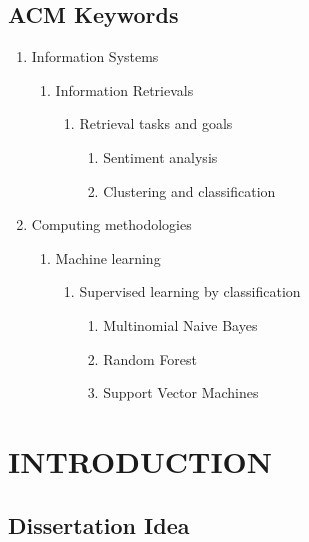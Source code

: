 \documentclass[oneside,a4paper,12pt]{pictreport}
\begin{document}
\section{ACM Keywords}
\begin{enumerate}[label=\Alph*]
    \item Information Systems
    \begin{enumerate}[label*=.\arabic*]
    \item Information Retrievals
    \begin{enumerate}[label*=.\arabic*]
        \item Retrieval tasks and goals
        \begin{enumerate}[label*=.\arabic*]
            \item Sentiment analysis
            \item Clustering and classification
        \end{enumerate}
        \end{enumerate}
    \end{enumerate}
    \item Computing methodologies
        \begin{enumerate}[label*=.\arabic*]
            
            \item Machine learning
            \begin{enumerate}[label*=.\arabic*]
                \item Supervised learning by classification
                \begin{enumerate}[label*=.\arabic*]
                    \item Multinomial Naive Bayes
                    \item Random Forest
                    \item Support Vector Machines
                \end{enumerate}
            \end{enumerate}
        \end{enumerate}
    \end{enumerate}
\chapter{INTRODUCTION}

\section{Dissertation Idea}
\end{document}
